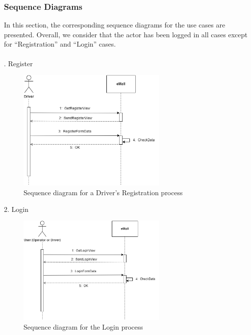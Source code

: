 \documentclass[../main.tex]{subfiles}
\begin{document}
\subsubsection{Sequence Diagrams}
In this section, the corresponding sequence diagrams for the use cases are presented. Overall, we consider that the actor has been logged in all cases except for “Registration” and “Login” cases.
\\
\\
. Register
\begin{figure}[H]
    \centering
    \includegraphics[width=0.65\textwidth]{sequences/sd_register.png}
    \caption{Sequence diagram for a Driver's Registration process}
    \label{fig:register}
\end{figure}

2. Login
\begin{figure}[H]
    \centering
    \includegraphics[width=0.65\textwidth]{sequences/sd_login.png}
    \caption{Sequence diagram for the Login process}
    \label{fig:login}
\end{figure}
\end{document}
